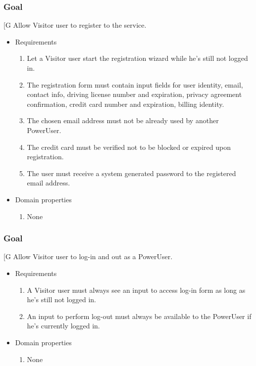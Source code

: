     \subsubsection{Goal }
    {[}G\arabic{goalctr}{]}
    Allow Visitor user to register to the service.
    \begin{itemize}
        \item Requirements
        \begin{enumerate}[REQ]
    		    \item Let a Visitor user start the registration wizard while he's still not logged in.
			    \item The registration form must contain input fields for user identity, email, contact info, driving license number and expiration, privacy agreement confirmation, credit card number and expiration, billing identity.
			    \item The chosen email address must not be already used by another PowerUser.
			    \item The credit card must be verified not to be blocked or expired upon registration.
			    \item The user must receive a system generated password to the registered email address.
        \end{enumerate}
        \item Domain properties
        \begin{enumerate}[PRO]
    			\item None
        \end{enumerate}
    \end{itemize}

    \subsubsection{Goal }
    {[}G\arabic{goalctr}{]}
    Allow Visitor user to log-in and out as a PowerUser.
    \begin{itemize}
        \item Requirements
        \begin{enumerate}[REQ]
			    \item A Visitor user must always see an input to access log-in form as long as he's still not logged in.
		        \item An input to perform log-out must always be available to the PowerUser if he's currently logged in.
        \end{enumerate}
        \item Domain properties
        \begin{enumerate}[PRO]
    			\item None
        \end{enumerate}
    \end{itemize}

